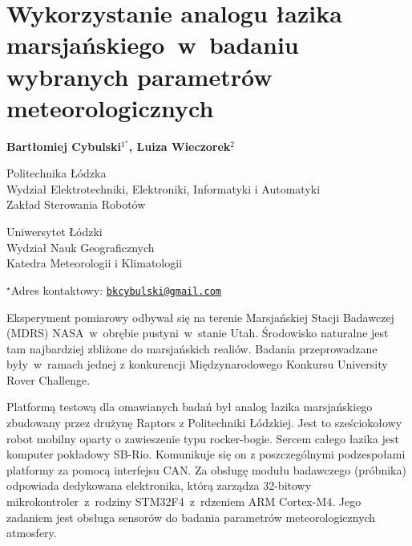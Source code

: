 \documentclass[\main/boa.tex]{subfiles}
\begin{document}
\sloppy

\section{Wykorzystanie analogu łazika marsjańskiego~w~badaniu wybranych parametrów meteorologicznych}

\begin{center}
  {\bf {} Bartłomiej Cybulski$^{1^\star}$,   Luiza Wieczorek$^{2}$}
\end{center}

\vskip 0.3cm

\begin{affiliations}
\begin{enumerate}
\begin{minipage}{0.915\textwidth}
\centering
\item Politechnika Łódzka\\ Wydział Elektrotechniki, Elektroniki, Informatyki i Automatyki\\ Zakład Sterowania Robotów
\item Uniwersytet Łódzki \\ Wydział Nauk Geograficznych \\ Katedra Meteorologii i Klimatologii\\[-2pt]
\end{minipage}
\end{enumerate}
$^\star$Adres kontaktowy: \href{mailto:bkcybulski@gmail.com}{\nolinkurl{bkcybulski@gmail.com}}\\
\end{affiliations}

\vskip 0.5cm


\vskip 0.5cm

Eksperyment pomiarowy odbywał się na terenie Marsjańskiej Stacji Badawczej (MDRS) NASA~w~obrębie pustyni~w~stanie Utah. Środowisko naturalne jest tam najbardziej zbliżone do marsjańskich realiów. Badania przeprowadzane były~w~ramach jednej z konkurencji Międzynarodowego Konkursu University Rover Challenge. 

Platformą testową dla omawianych badań był analog łazika marsjańskiego zbudowany przez drużynę Raptors z Politechniki Łódzkiej. Jest to sześciokołowy robot mobilny oparty o zawieszenie typu rocker-bogie. Sercem całego łazika jest komputer pokładowy SB-Rio. Komunikuje się on z poszczególnymi podzespołami platformy za pomocą interfejsu CAN. Za obsługę modułu badawczego (próbnika) odpowiada dedykowana elektronika, którą zarządza 32-bitowy mikrokontroler~z~rodziny STM32F4~z~rdzeniem ARM Cortex-M4. Jego zadaniem jest obsługa sensorów do badania parametrów meteorologicznych atmosfery.
\end{document}
